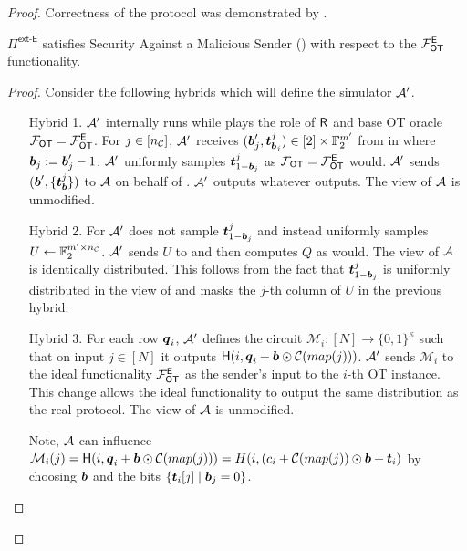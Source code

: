 \begin{proof}
	Correctness of the protocol was demonstrated by \cite{RSA:OrrOrsSch17}.%
	\begin{claim}\label{claim:ext-E-MalSender}
		$\Pi^\textsf{ext-E}$ satisfies Security Against a Malicious Sender () with respect to the $\mathcal{F}_{\mathsf{OT}}^\mathsf{E}$ functionality.
	\end{claim}
	\begin{proof}
		Consider the following hybrids which will define the simulator $\mathcal{A}'$. 
		\begin{enumerate}[leftmargin=1.8cm]
			\item[Hybrid 1.] $\mathcal{A}'$ internally runs \Adv while plays the role of $\mathsf{R}$ and base OT oracle $\mathcal{F}_{\mathsf{OT}}=\mathcal{F}_{\mathsf{OT}}^\mathsf{E}$. For $j\in[{n_\mathcal{C}}]$, $\mathcal{A}'$ receives $(\boldsymbol{b}'_j,\boldsymbol{t}^j_{\boldsymbol{b}_j})\in [2]\times \mathbb{F}^{m'}_2$ from \Adv in  where $\boldsymbol{b}_j:=\boldsymbol{b}_j'-1$. $\mathcal{A}'$ uniformly samples $\boldsymbol{t}^j_{1-\boldsymbol{b}_j}$ as $\mathcal{F}_{\mathsf{OT}}=\mathcal{F}_{\mathsf{OT}}^\mathsf{E}$ would. $\mathcal{A}'$ sends $(\boldsymbol{b}', \{\boldsymbol{t}^j_{\boldsymbol{b}}\})$ to $\mathcal{A}$ on behalf of \OOT. $\mathcal{A}'$ outputs whatever \Adv outputs. The view of $\mathcal{A}$ is unmodified.
			
			\item[Hybrid 2.] For  $\mathcal{A}'$ does not sample $\boldsymbol{t}^j_{1-\boldsymbol{b}_j}$ and instead uniformly samples $U\gets\mathbb{F}^{m'\times {n_\mathcal{C}}}_2$. $\mathcal{A}'$ sends $U$ to \Adv and then computes $Q$ as \send would. The view of $\mathcal{A}$ is identically distributed. This follows from the fact that $\boldsymbol{t}^j_{1-\boldsymbol{b}_j}$ is uniformly distributed in the view of \Adv and masks the $j$-th column of $U$ in the previous hybrid. 
			
			\item[Hybrid 3.]\label{hybrid:malSendExtract} For each row $\boldsymbol{q}_i$, $\mathcal{A}'$ defines the circuit $\mathcal{M}_i:[N]\rightarrow\{0,1\}^\kappa$ such that on input $j\in[N]$ it outputs $\mathsf{H}(i, \boldsymbol{q}_i+\boldsymbol{b}\odot \mathcal{C}(map(j)))$. $\mathcal{A}'$ sends $\mathcal{M}_i$ to the ideal functionality $\mathcal{F}_{\mathsf{OT}}^\mathsf{E}$ as the sender's input to the $i$-th OT instance. This change allows the ideal functionality to output the same distribution as the real protocol. The view of $\mathcal{A}$ is unmodified.
			
			Note, $\mathcal{A}$ can influence $\mathcal{M}_i(j)=\mathsf{H}(i, \boldsymbol{q}_i+\boldsymbol{b}\odot \mathcal{C}(map(j)))=H(i, (c_i + \mathcal{C}(map(j)) \odot \boldsymbol{b} + \boldsymbol{t}_i)$ by choosing $\boldsymbol{b}$ and the bits $\{\boldsymbol{t}_i[j] \mid \boldsymbol{b}_j=0\}$.
			

\end{enumerate}
\end{proof}
\end{proof}
